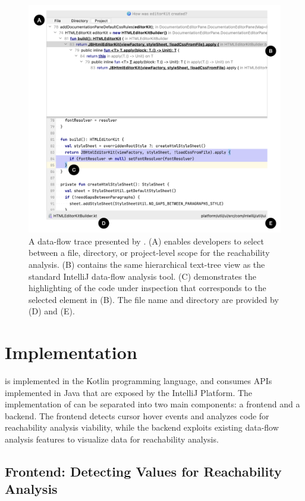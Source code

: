 \begin{figure}[ht]
\centering
\includegraphics[width=\textwidth]{./figs/reach-hover-vis.png}
\caption{
  A data-flow trace presented by \toolname{}. (A) enables developers to select
  between a file, directory, or project-level scope for the reachability
  analysis. (B) contains the same hierarchical text-tree view as the standard
  IntelliJ data-flow analysis tool. (C) demonstrates the highlighting of the
  code under inspection that corresponds to the selected element in (B).
  The file name and directory are provided by (D) and (E).
}
\label{fig:ReachHoverVis}
\end{figure}

\section{Implementation}
\label{sec:Impl}

\toolname{} is implemented in the Kotlin programming language, and consumes
\acp{API} implemented in Java that are exposed by the IntelliJ Platform.
The implementation of \toolname{} can be separated into two main components:
a frontend and a backend.
The frontend detects cursor hover events and analyzes code for
reachability analysis viability, while the backend exploits existing data-flow
analysis features to visualize data for reachability analysis.

\subsection{Frontend: Detecting Values for Reachability Analysis}
\label{subsec:Frontend}

